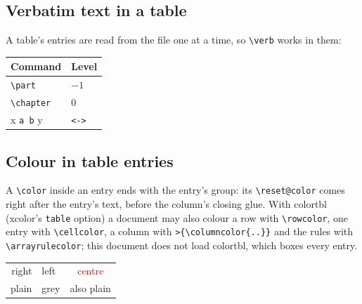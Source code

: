 \documentclass{article}
\numberwithin{equation}{section}
\theoremstyle{definition}
\theoremstyle{remark}
\begin{document}
\subsection{Verbatim text in a table}\label{sec:verbtab}
A table's entries are read from the file one at a time, so \verb|\verb| works in them:
\begin{center}
  \begin{tabular}{ll}
    \toprule
    Command & Level \\
    \midrule
    \verb|\part|    & $-1$ \\
    \verb|\chapter| & 0 \\
    x \verb*|a b| y & \verb!<->! \\
    \bottomrule
  \end{tabular}
\end{center}

\subsection{Colour in table entries}\label{sec:cellcolour}
A \verb|\color| inside an entry ends with the entry's group: its \verb|\reset@color| comes
right after the entry's text, before the column's closing glue. With colortbl (xcolor's
\texttt{table} option) a document may also colour a row with \verb|\rowcolor|, one entry
with \verb|\cellcolor|, a column with \verb|>{\columncolor{..}}| and the rules with
\verb|\arrayrulecolor|; this document does not load colortbl, which boxes every entry.

\begin{center}
\begin{tabular}{rlc}
\color{red}right & \color{blue}left & \textcolor{red}{centre}\\
plain & \color{gray}grey & also plain
\end{tabular}
\end{center}
\end{document}
